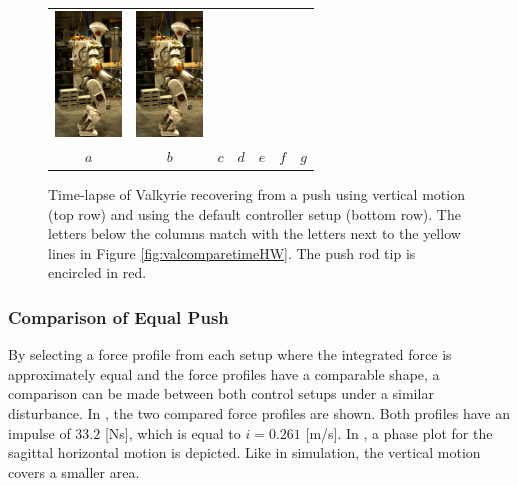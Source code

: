 \begin{figure}
\begin{tabular}{ccccccc}
    \includegraphics[width=0.7in]{STYLESTUFF/val6d_30} &
    \includegraphics[width=0.7in]{STYLESTUFF/val7d_30} \\
    $a$&
    $b$&
    $c$&
    $d$&
    $e$&
    $f$&
    $g$\\
  \end{tabular}
  \caption{Time-lapse of Valkyrie recovering from a push using vertical motion (top row) and using the default controller setup (bottom row). The letters below the columns match with the letters next to the yellow lines in Figure \ref{fig:valcomparetimeHW}. The push rod tip is encircled in red.}
  \label{fig:val}
\end{figure}

\subsubsection{Comparison of Equal Push} 
By selecting a force profile from each setup where the integrated force is approximately equal and the force profiles have a comparable shape, a comparison can be made between both control setups under a similar disturbance. In , the two compared force profiles are shown. Both profiles have an impulse of $33.2$ [Ns], which is equal to $i=0.261$ [m/s]. In , a phase plot for the sagittal horizontal motion is depicted. Like in simulation, the vertical motion covers a smaller area. 

